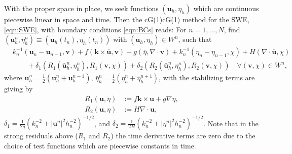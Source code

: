 With the proper space in place, we seek functions $(\mathbf{u}_h, \eta_h)$ which
are continuous piecewise linear in space and time. Then the cG(1)cG(1) method
for the SWE, \eqref{eqn:SWE}, with boundary conditions \eqref{eqn:BCs} reads:
For $n = 1, \dots, N$, find $(\mathbf{u}_h^n, \eta_h^n) \equiv
(\mathbf{u}_h(t_n), \eta_h(t_n))$ with $(\mathbf{u}_h, \eta_h) \in W^n$, such
that
\begin{equation}
  \begin{split}
    &k_n^{-1}(\mathbf{u}_n - \mathbf{u}_{n-1}, \mathbf{v}) + f(\mathbf{k} \times
        \bar{\mathbf{u}}, \mathbf{v}) - g (\bar{\eta}, \nabla\cdot \mathbf{v})
        + k_n^{-1}(\eta_n - \eta_{n-1}, \chi) + H (\nabla\cdot \bar{\mathbf{u}},\chi) \\
    &\qquad+ \delta_1 ( R_1(\bar{\mathbf{u}}_h^n, \eta_h^n),
        R_1(\mathbf{v}, \chi))
    + \delta_2 (R_2(\bar{\mathbf{u}}_h^n, \eta_h^n),
        R_2(\mathbf{v}, \chi))
    \quad \forall (\mathbf{v},\chi) \in W^n,
  \end{split}
  \label{eqn:cG1cG1}
\end{equation}
where $\bar{\mathbf{u}}_h^n = \frac{1}{2}(\mathbf{u}_h^n + \mathbf{u}_h^{n-1}),\,
\bar{\eta}_h^n = \frac{1}{2}(\eta_h^n + \eta_h^{n+1})$, with the stabilizing
terms are giving by
\begin{align*}
  R_1(\mathbf{u},\eta) &:= f\mathbf{k} \times \mathbf{u} + g \nabla \eta, \\
  R_2(\mathbf{u},\eta) &:= H \nabla\cdot \mathbf{u},
\end{align*}
$\delta_1 = \frac{1}{2g}(k_n^{-2} + |\mathbf{u}^n|^2 h_n^{-2})^{-1/2}$, and
$\delta_2 = \frac{1}{2H}(k_n^{-2} + |\eta^n|^2 h_n^{-2})^{-1/2}$. Note that in
the strong residuals above ($R_1$ and $R_2$) the time derivative terms are zero
due to the choice of test functions which are piecewise constants in time.
